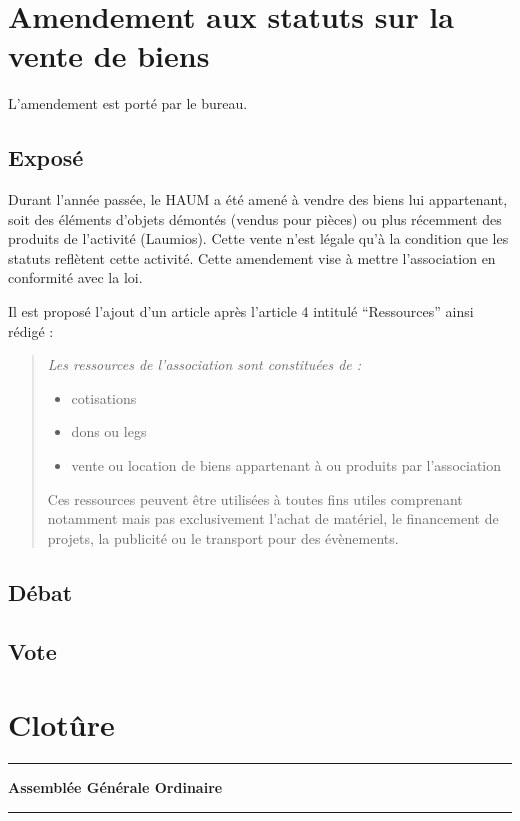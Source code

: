 \documentclass[11pt]{article}
\begin{document}
\section{Amendement aux statuts sur la vente de biens}

L'amendement est porté par le bureau.

\subsection{Exposé}

Durant l'année passée, le HAUM a été amené à vendre des biens lui appartenant, soit des éléments d'objets démontés (vendus pour pièces) ou plus récemment des produits de l'activité (Laumios). Cette vente n'est légale qu'à la condition que les statuts reflètent cette activité. Cette amendement vise à mettre l'association en conformité avec la loi.

Il est proposé l'ajout d'un article après l'article 4 intitulé ``Ressources'' ainsi rédigé :

\begin{quotation}
\itshape
\noindent Les ressources de l'association sont constituées de :
\begin{itemize}
    \item cotisations
    \item dons ou legs
    \item vente ou location de biens appartenant à ou produits par l'association
\end{itemize}
Ces ressources peuvent être utilisées à toutes fins utiles comprenant notamment mais pas exclusivement l'achat de matériel, le financement de projets, la publicité ou le transport pour des évènements.
\end{quotation}

\subsection{Débat}
\subsection{Vote}

\section*{Clotûre}

\vspace{1.5cm}

\hrule
\vspace{.6cm}
\begin{center}
\Large\bfseries Assemblée Générale Ordinaire
\end{center}
\vspace{.3cm}
\hrule
\end{document}

